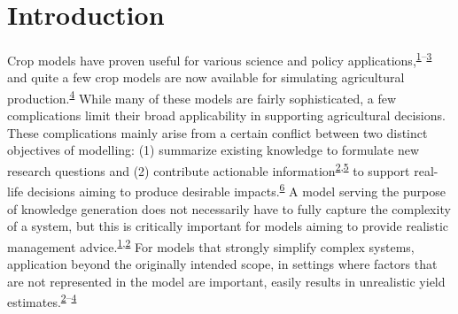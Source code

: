 \documentclass[]{elsarticle} %
\begin{document}
\hypertarget{introduction}{%
\section*{Introduction}\label{introduction}}

Crop models have proven useful for various science and policy applications,\textsuperscript{\protect\hyperlink{ref-Boote_et_al_1996}{1}--\protect\hyperlink{ref-VanIttersum_et_al_2013}{3}} and quite a few crop models are now available for simulating agricultural production.\textsuperscript{\protect\hyperlink{ref-Murthy_2004}{4}} While many of these models are fairly sophisticated, a few complications limit their broad applicability in supporting agricultural decisions. These complications mainly arise from a certain conflict between two distinct objectives of modelling: (1) summarize existing knowledge to formulate new research questions and (2) contribute actionable information\textsuperscript{\protect\hyperlink{ref-Uusitalo_et_al_2015}{2},\protect\hyperlink{ref-Luedeling_et_al_2017}{5}} to support real-life decisions aiming to produce desirable impacts.\textsuperscript{\protect\hyperlink{ref-Luedeling_and_Shepherd_2016}{6}} A model serving the purpose of knowledge generation does not necessarily have to fully capture the complexity of a system, but this is critically important for models aiming to provide realistic management advice.\textsuperscript{\protect\hyperlink{ref-Boote_et_al_1996}{1},\protect\hyperlink{ref-Uusitalo_et_al_2015}{2}} For models that strongly simplify complex systems, application beyond the originally intended scope, in settings where factors that are not represented in the model are important, easily results in unrealistic yield estimates.\textsuperscript{\protect\hyperlink{ref-Uusitalo_et_al_2015}{2}--\protect\hyperlink{ref-Murthy_2004}{4}}
\end{document}

